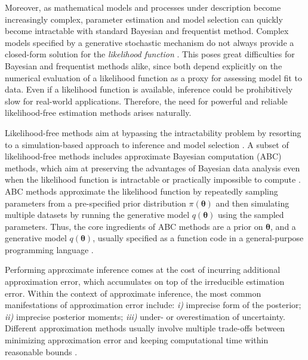 \documentclass[9pt,twoside,lineno]{pnas-new}
\begin{document}
Moreover, as mathematical models and processes under description become increasingly complex, parameter estimation and model selection can quickly become intractable with standard Bayesian and frequentist method. Complex models specified by a generative stochastic mechanism do not always provide a closed-form solution for the \textit{likelihood function} \cite{palestro2018likelihood, csillery2010approximate, toni2009simulation}. This poses great difficulties for Bayesian and frequentist methods alike, since both depend explicitly on the numerical evaluation of a likelihood function as a proxy for assessing model fit to data. Even if a likelihood function is available, inference could be prohibitively slow for real-world applications. Therefore, the need for powerful and reliable likelihood-free estimation methods arises naturally. 

Likelihood-free methods aim at bypassing the intractability problem by resorting to a simulation-based approach to inference and model selection \cite{palestro2018likelihood}. A subset of likelihood-free methods includes approximate Bayesian computation (ABC) methods, which aim at preserving the advantages of Bayesian data analysis even when the likelihood function is intractable or practically impossible to compute \cite{turner2014generalized, sunnaaker2013approximate}. ABC methods approximate the likelihood function by repeatedly sampling parameters from a pre-specified prior distribution $\pi(\boldsymbol{\theta})$ and then simulating multiple datasets by running the generative model $q(\boldsymbol{\theta})$ using the sampled parameters. Thus, the core ingredients of ABC methods are a prior on $\boldsymbol{\theta}$, and a generative model $q(\boldsymbol{\theta})$, usually specified as a function code in a general-purpose programming language \cite{csillery2010approximate, mertens2018abrox}.

Performing approximate inference comes at the cost of incurring additional approximation error, which accumulates on top of the irreducible estimation error. Within the context of approximate inference, the most common manifestations of approximation error include: \textit{i)} imprecise form of the posterior; \textit{ii)} imprecise posterior moments; \textit{iii)} under- or overestimation of uncertainty. Different approximation methods usually involve multiple trade-offs between minimizing approximation error and keeping computational time within reasonable bounds \cite{frazier2018asymptotic, palestro2018likelihood}.
\end{document}
